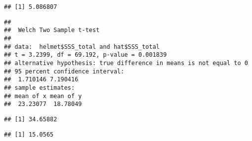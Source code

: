 \documentclass[]{article}
\newenvironment{Shaded}{\begin{snugshade}}{\end{snugshade}}
\newcommand{\KeywordTok}[1]{\textcolor[rgb]{0.13,0.29,0.53}{\textbf{#1}}}
\newcommand{\DecValTok}[1]{\textcolor[rgb]{0.00,0.00,0.81}{#1}}
\newcommand{\StringTok}[1]{\textcolor[rgb]{0.31,0.60,0.02}{#1}}
\newcommand{\CommentTok}[1]{\textcolor[rgb]{0.56,0.35,0.01}{\textit{#1}}}
\newcommand{\OperatorTok}[1]{\textcolor[rgb]{0.81,0.36,0.00}{\textbf{#1}}}
\newcommand{\NormalTok}[1]{#1}
\begin{document}
\begin{verbatim}
## [1] 5.086807
\end{verbatim}

\begin{Shaded}
\end{Shaded}

\begin{verbatim}
## 
##  Welch Two Sample t-test
## 
## data:  helmet$SSS_total and hat$SSS_total
## t = 3.2399, df = 69.192, p-value = 0.001839
## alternative hypothesis: true difference in means is not equal to 0
## 95 percent confidence interval:
##  1.710146 7.190416
## sample estimates:
## mean of x mean of y 
##  23.23077  18.78049
\end{verbatim}

\begin{Shaded}
\end{Shaded}

\begin{verbatim}
## [1] 34.65882
\end{verbatim}

\begin{Shaded}
\end{Shaded}

\begin{verbatim}
## [1] 15.0565
\end{verbatim}

\begin{Shaded}
\end{Shaded}
\end{document}
